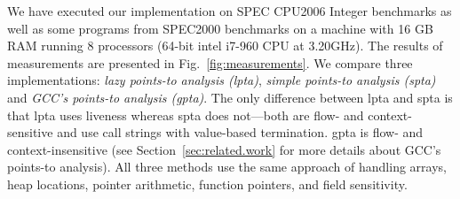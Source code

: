 \documentclass{llncs}
\begin{document}
We have executed our implementation on SPEC CPU2006 Integer 
benchmarks
as well as 
some programs from SPEC2000 benchmarks on a machine with 16 GB RAM
running 8 processors (64-bit intel i7-960 CPU at 3.20GHz).
The results of measurements are presented in
Fig.~\ref{fig:measurements}. We compare three implementations:
{\em lazy points-to analysis (lpta)},
{\em simple points-to analysis (spta)} and
{\em GCC's points-to analysis (gpta)}.
The only difference between lpta and spta
is that lpta uses liveness whereas spta does not---both are flow- and
context-sensitive and use call strings with value-based termination.
gpta is flow- and context-insensitive (see Section~\ref{sec:related.work} for
more details about GCC's points-to analysis). All three methods use the
same approach of handling arrays, heap locations, pointer arithmetic,
function pointers, and field sensitivity.
\end{document}
